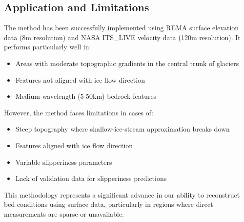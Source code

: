\subsection*{Application and Limitations}

The method has been successfully implemented using REMA surface elevation data (8m resolution) and NASA ITS\_LIVE velocity data (120m resolution). It performs particularly well in:
\begin{itemize}
\item Areas with moderate topographic gradients in the central trunk of glaciers
\item Features not aligned with ice flow direction
\item Medium-wavelength (5-50km) bedrock features
\end{itemize}
However, the method faces limitations in cases of:
\begin{itemize}
\item Steep topography where shallow-ice-stream approximation breaks down
\item Features aligned with ice flow direction
\item Variable slipperiness parameters
\item Lack of validation data for slipperiness predictions
\end{itemize}
This methodology represents a significant advance in our ability to reconstruct bed conditions using surface data, particularly in regions where direct measurements are sparse or unavailable.





